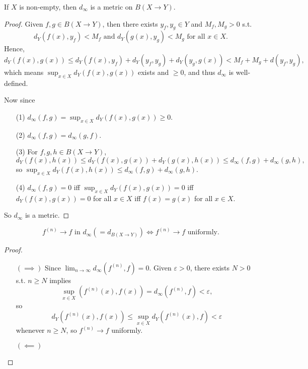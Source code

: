 \begin{proposition}
    If \(X\) is non-empty, then \(d_\infty \) is a metric on \(B(X \to Y)\).  
\end{proposition}
\begin{proof}
    Given \(f, g \in B(X \to Y)\), then there exists \(y_f, y_g \in Y\) and \(M_f, M_g > 0\) s.t.
    \[
        d_Y (f(x), y_f) < M_f \text{ and } d_Y (g(x), y_g) < M_g \text{ for all } x \in X. 
    \]  
    Hence, 
    \[
        d_Y (f(x), g(x)) \le d_Y (f(x), y_f) + d_Y(y_f, y_g) + d_Y(y_g, g(x)) < M_f + M_g + d(y_f, y_g),
    \] which means \(\sup _{x \in X} d_Y(f(x), g(x))\) exists and \(\ge 0\), and thus \(d_\infty \) is well-defined.  
    
    Now since 
    \begin{itemize}
        \item [(1)] \(d_\infty (f, g) = \sup _{x \in X} d_Y (f(x), g(x))\ge 0\). 
        \item [(2)] \(d_\infty (f, g) = d_\infty (g, f)\). 
        \item [(3)] For \(f, g, h \in B(X \to Y)\), 
        \[
            d_Y (f(x), h(x)) \le d_Y(f(x), g(x)) + d_Y (g(x), h(x)) \le d_\infty (f, g) + d_\infty (g, h),
        \]
        so \(\sup _{x \in X} d_Y(f(x), h(x)) \le d_\infty (f, g) + d_\infty (g, h)\). 
        \item [(4)] \(d_\infty (f, g) = 0\) iff \(\sup _{x \in X} d_Y (f(x), g(x)) = 0\) iff \(d_Y(f(x), g(x)) = 0\) for all \(x \in X\) iff \(f(x) = g(x)\) for all \(x \in X\).       
    \end{itemize}
    So \(d_\infty \) is a metric. 
\end{proof}

\begin{proposition}
    \[
        f^{(n)} \to f \text{ in } d_\infty ( = d_{B(X \to Y)}) \iff f^{(n)} \to f \text{ uniformly}.  
    \]
\end{proposition}
\begin{proof}
    \vphantom{text}
    \begin{itemize}
        \item [\((\implies )\)] Since \(\lim_{n \to \infty} d_\infty \left( f^{(n)}, f \right) = 0  \). Given \(\varepsilon > 0\), there exists \(N > 0\) s.t. \(n \ge N\) implies 
        \[
            \sup _{x \in X} \left( f^{(n)}(x), f(x) \right)  = d_\infty \left( f^{(n)}, f \right) < \varepsilon,
        \] so 
        \[
            d_Y \left( f^{(n)}(x), f(x) \right) \le \sup _{x \in X} d_Y\left( f^{(n)}(x), f \right) < \varepsilon 
        \] whenever \(n \ge N\), so \(f^{(n)} \to f\) uniformly.  
        \item [\((\impliedby )\)] 
    \end{itemize}
\end{proof}

